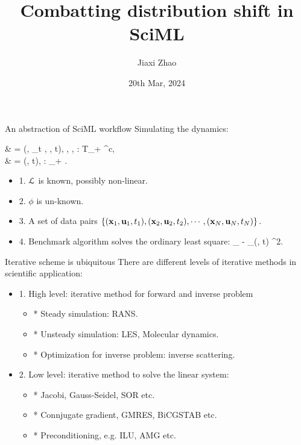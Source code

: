\documentclass{beamer}
\title[Distribution Mismatch]{Combatting distribution shift in SciML}
\author[J. Zhao]{Jiaxi Zhao}
\date{20th Mar, 2024}
\begin{document}
\par \setlength{\parindent}{2em}

\begin{frame}
\titlepage

\end{frame}

\begin{frame}{An abstraction of SciML workflow}
	Simulating the dynamics:
	\bequn
		\begin{aligned}
			 & = \mcL(\mfx, \p_t \mfx, \mfu, t), \quad \mfx \in \mcX, \mfu \in \mcU, \mcL: \mcX \times T\mcX \times \mcU \times \mbR_+ \rightarrow \mbR^{c},			\\
			\mfu & = \phi(\mfx, t), \quad \phi: \mcX \times \mbR_+ \rightarrow \mfu.
		\end{aligned}
	\eequn
	\begin{itemize}
		\item 1. $\mathcal{L}$ is known, possibly non-linear.
		\item 2. $\phi$ is un-known.
		\item 3. A set of data pairs $\left\{ (\mathbf{x}_1, \mathbf{u}_1, t_1), (\mathbf{x}_2, \mathbf{u}_2, t_2), \cdots, (\mathbf{x}_N, \mathbf{u}_N, t_N )\right\}. $
		\item 4. Benchmark algorithm solves the ordinary least square:
		\bequn
			\arg\min_{\theta} \mbE \norml \mfu - \phi_{\theta}(\mfx, t) \normr^2.
		\eequn
	\end{itemize}

\end{frame}

\begin{frame}{Iterative scheme is ubiquitous}
	There are different levels of iterative methods in scientific application:
	\begin{itemize}
		\item 1. High level: iterative method for forward and inverse problem
			\begin{itemize}
				\item * Steady simulation: RANS.
				\item * Unsteady simulation: LES, Molecular dynamics.
				\item * Optimization for inverse problem: inverse scattering.
			\end{itemize}
		\item 2. Low level: iterative method to solve the linear system:
			\begin{itemize}
				\item * Jacobi, Gauss-Seidel, SOR etc.
				\item * Connjugate gradient, GMRES, BiCGSTAB etc.
				\item * Preconditioning, e.g. ILU, AMG etc.
			\end{itemize}
	\end{itemize}
\end{frame}
\end{document}

